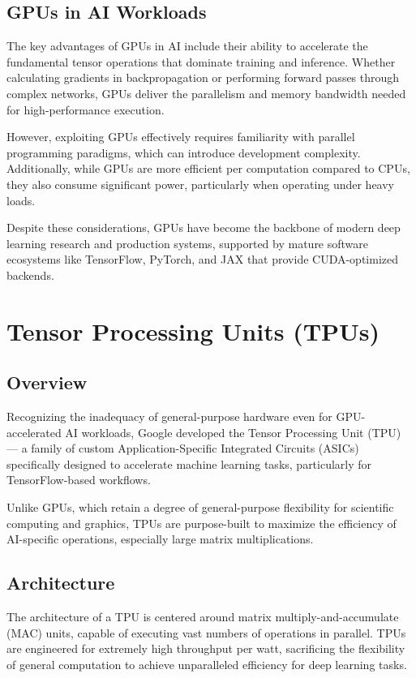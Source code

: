 \documentclass[openany]{book}
\begin{document}
\subsection{GPUs in AI Workloads}
The key advantages of GPUs in AI include their ability to accelerate the 
fundamental tensor operations that dominate training and inference. Whether 
calculating gradients in backpropagation or performing forward passes through 
complex networks, GPUs deliver the parallelism and memory bandwidth needed for 
high-performance execution.

However, exploiting GPUs effectively requires familiarity with parallel 
programming paradigms, which can introduce development complexity. Additionally,
while GPUs are more efficient per computation compared to CPUs, they also 
consume significant power, particularly when operating under heavy loads.

Despite these considerations, GPUs have become the backbone of modern deep 
learning research and production systems, supported by mature software 
ecosystems like TensorFlow, PyTorch, and JAX that provide CUDA-optimized 
backends.

\section{Tensor Processing Units (TPUs)}

\subsection{Overview}
Recognizing the inadequacy of general-purpose hardware even for GPU-accelerated 
AI workloads, Google developed the Tensor Processing Unit (TPU) — a family of 
custom Application-Specific Integrated Circuits (ASICs) specifically designed to 
accelerate machine learning tasks, particularly for TensorFlow-based workflows.

Unlike GPUs, which retain a degree of general-purpose flexibility for scientific 
computing and graphics, TPUs are purpose-built to maximize the efficiency of 
AI-specific operations, especially large matrix multiplications.

\subsection{Architecture}
The architecture of a TPU is centered around matrix multiply-and-accumulate 
(MAC) units, capable of executing vast numbers of operations in parallel. TPUs 
are engineered for extremely high throughput per watt, sacrificing the 
flexibility of general computation to achieve unparalleled efficiency for deep 
learning tasks.
\end{document}
